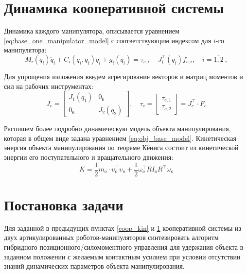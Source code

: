 \section{Динамика кооперативной системы}
\label{coop_dyn}
Динамика каждого манипулятора, описывается уравнением \eqref{eq:base_one_manipulator_model} с соответствующим индексом для $i$-го манипулятора:
\begin{equation}
  M_i(q_i)\ddot{q}_i + C_i(q_i,\dot{q}_i)\dot{q}_i + g_i(q_i) = \tau_{c,i} - J_i^\top(q_i) f_{c,i}, \quad i =\overline{1,2} \ ,
  \label{eq:base_i_manipulator_model}
\end{equation}

Для упрощения изложения введем агрегирование векторов и матриц моментов и сил на рабочих инструментах:
\begin{equation}
   J_c = \begin{bmatrix} J_1(q_1) & 0_6\\ 0_6 & J_2(q_2) \end{bmatrix},\quad  \tau_c = \begin{bmatrix} \tau_{c,1}\\ \tau_{c,2} \end{bmatrix} = J_c^\top \cdot F_c
\end{equation}

Распишем более подробно динамическую модель объекта манипулирования, которая в общем виде задана уравнением \ref{eq:obj_base_model}.
Кинетическая энергия объекта манипулирования по теореме Кёнига состоит из кинетической энергии его поступательного и вращательного движения:
\begin{equation}
  K = \frac{1}{2}m_o\cdot \upsilon^\top_o \upsilon_o + \frac{1}{2} \omega_o^\top R I_o R^\top \omega_o
\end{equation}


\section{Постановка задачи}
Для заданной в предыдущих пунктах \ref{coop_kin} и \ref{coop_dyn} кооперативной системы из двух артикулированных роботов-манипуляторов синтезировать алгоритм гибридного позиционного/силомоментного управления для удержания объекта в заданном положении с желаемым контактным усилием при условии отсутствии знаний динамических параметров объекта манипулирования.

